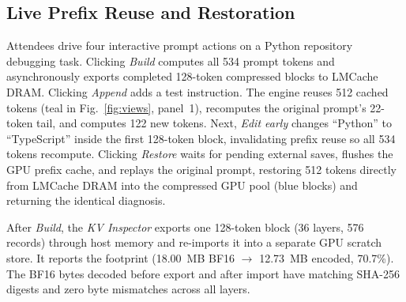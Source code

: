 \documentclass[conference]{IEEEtran}
\begin{document}
\subsection*{Live Prefix Reuse and Restoration}
Attendees drive four interactive prompt actions on a Python repository
debugging task. Clicking \emph{Build} computes all 534 prompt tokens and
asynchronously exports completed 128-token compressed blocks to LMCache DRAM.
Clicking \emph{Append} adds a test instruction. The engine reuses 512 cached
tokens (teal in Fig.~\ref{fig:views}, panel~1), recomputes the original prompt's
22-token tail, and computes 122 new tokens. Next, \emph{Edit early} changes ``Python'' to
``TypeScript'' inside the first 128-token block, invalidating prefix reuse so
all 534 tokens recompute. Clicking \emph{Restore} waits for pending external saves, flushes the GPU prefix
cache, and replays the original prompt, restoring 512 tokens directly from
LMCache DRAM into the compressed GPU pool (blue blocks) and returning the
identical diagnosis.

After \emph{Build}, the \emph{KV Inspector} exports one 128-token block
(36 layers, 576 records) through host memory and re-imports it into a separate
GPU scratch store. It reports the footprint (18.00~MB BF16 $\rightarrow$
12.73~MB encoded, 70.7\%). The BF16 bytes decoded before export and after
import have matching SHA-256 digests and zero byte mismatches across all layers.
\end{document}
